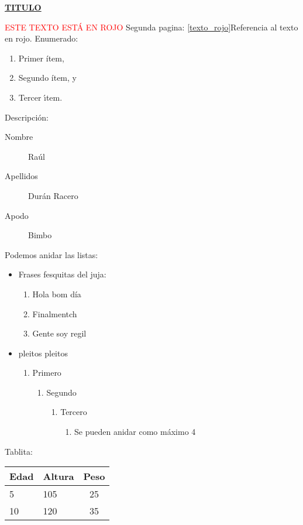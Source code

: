 \documentclass[a4paper]{article}
\begin{document}
  \pagestyle{plain}
  \begin{center}
    \Huge\textsc{\textbf{\underline{TITULO}}}
  \end{center}
  \label{texto_rojo}\normalsize\textcolor{Red}{ESTE TEXTO ESTÁ EN ROJO}
  \clearpage
  Segunda pagina: \newline
  \ref{texto_rojo}Referencia al texto en rojo. Enumerado:\newline
  \begin{enumerate}
    \item Primer ítem,
    \item Segundo ítem, y
    \item Tercer \'{\i}tem.
  \end{enumerate}
  Descripción:
  \begin{description}
    \item[Nombre] Raúl
    \item[Apellidos] Durán Racero
    \item[Apodo] Bimbo   
  \end{description}

  Podemos anidar las listas:
  \begin{itemize}
    \item Frases fesquitas del juja:
    \begin{enumerate}
      \item Hola bom día
      \item Finalmentch
      \item Gente soy regil
    \end{enumerate}
    \item pleitos pleitos
    \begin{enumerate}
      \item Primero
      \begin{enumerate}
        \item Segundo
        \begin{enumerate}
          \item Tercero
          \begin{enumerate}
            \item Se pueden anidar como máximo 4
          \end{enumerate}
        \end{enumerate}
      \end{enumerate}
    \end{enumerate}
  \end{itemize}

  Tablita:
\begin{tabular}{|p{3cm}|p{5cm}|c|}
  \hline 
  Edad & Altura & Peso  \\
  \hline 
  5 & 105 & 25  \\
  \hline 
  10  & 120 & 35  \\
  \hline
\end{tabular}
\end{document}
